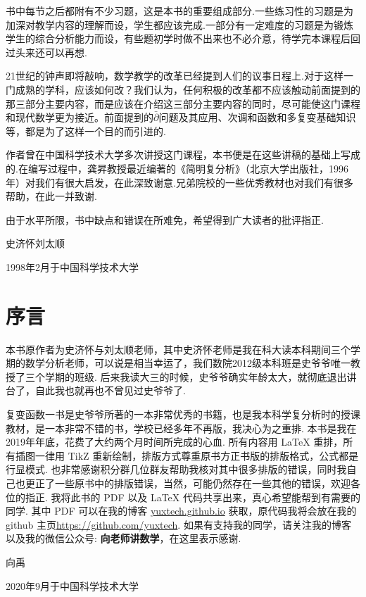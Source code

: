 书中每节之后都附有不少习题，这是本书的重要组成部分.一些练习性的习题是为加深对教学内容的理解而设，学生都应该完成.一部分有一定难度的习题是为锻炼学生的综合分析能力而设，有些题初学时做不出来也不必介意，待学完本课程后回过头来还可以再想.

21世纪的钟声即将敲响，数学教学的改革已经提到人们的议事日程上.对于这样一门成熟的学科，应该如何改？我们认为，任何积极的改革都不应该触动前面提到的那三部分主要内容，而是应该在介绍这三部分主要内容的同时，尽可能使这门课程和现代数学更为接近。前面提到的$\bar\partial$问题及其应用、次调和函数和多复变基础知识等，都是为了这样一个目的而引进的.

作者曾在中国科学技术大学多次讲授这门课程，本书便是在这些讲稿的基础上写成的.在编写过程中，龚昇教授最近编著的《简明复分析》（北京大学出版社，1996年）对我们有很大启发，在此深致谢意.兄弟院校的一些优秀教材也对我们有很多帮助，在此一并致谢.

由于水平所限，书中缺点和错误在所难免，希望得到广大读者的批评指正.

\vspace*{1cm}
\hfill {\kaishu 史济怀\qquad 刘太顺}\hspace*{1.2cm}

\hfill 1998年2月于中国科学技术大学

\newpage
\chapter*{序\qquad 言}
本书原作者为史济怀与刘太顺老师，其中史济怀老师是我在科大读本科期间三个学期的数学分析老师，可以说是相当幸运了，我们数院2012级本科班是史爷爷唯一教授了三个学期的班级. 后来我读大三的时候，史爷爷确实年龄太大，就彻底退出讲台了，自此我也就再也不曾见过史爷爷了.

复变函数一书是史爷爷所著的一本非常优秀的书籍，也是我本科学复分析时的授课教材，是一本非常不错的书，学校已经多年不再版，我决心为之重排. 本书是我在2019年年底，花费了大约两个月时间所完成的心血. 所有内容用 \LaTeX{} 重排，所有插图一律用 TikZ 重新绘制，排版方式尊重原书方正书版的排版格式，公式都是行显模式. 也非常感谢积分群几位群友帮助我核对其中很多排版的错误，同时我自己也更正了一些原书中的排版错误，当然，可能仍然存在一些其他的错误，欢迎各位的指正. 我将此书的 PDF 以及 \LaTeX{} 代码共享出来，真心希望能帮到有需要的同学. 其中 PDF 可以在我的博客 \href{yuxtech.github.io}{yuxtech.github.io} 获取，原代码我将会放在我的 github 主页\href{https://github.com/yuxtech}{https://github.com/yuxtech}. 如果有支持我的同学，请关注我的博客以及我的微信公众号: \textbf{向老师讲数学}，在这里表示感谢.

\hfill {\kaishu 向禹}\hspace*{2.8cm}

\hfill 2020年9月于中国科学技术大学
